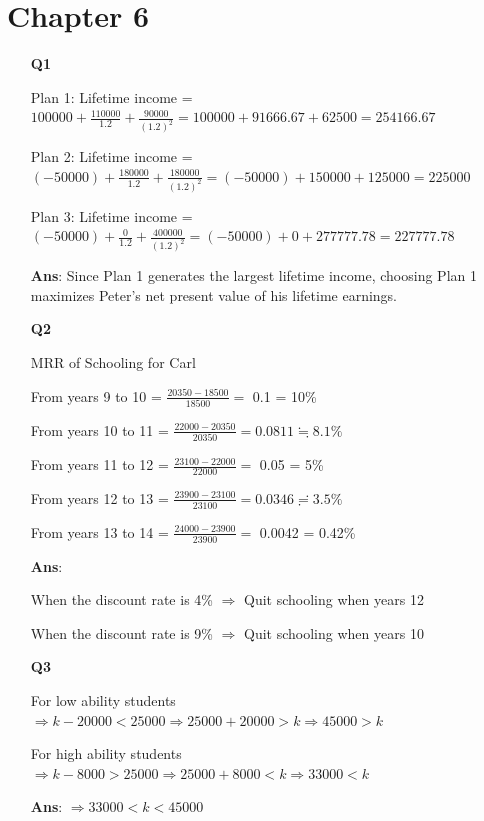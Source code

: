 \documentclass[12pt]{article}
\begin{document}
\section{Chapter 6}
\begin{enumerate}
    \item [\textbf{Q1}]

    Plan 1:
    Lifetime income = $100000 + \frac{110000}{1.2} + \frac{90000}{(1.2)^2} = 100000 + 91666.67 + 62500 = 254166.67$
    
    Plan 2:
    Lifetime income = $(-50000) + \frac{180000}{1.2} + \frac{180000}{(1.2)^2} = (-50000) + 150000 + 125000 = 225000$

    Plan 3:
    Lifetime income = $(-50000) + \frac{0}{1.2} + \frac{400000}{(1.2)^2} = (-50000) + 0 + 277777.78 = 227777.78$

    \textbf{Ans}:
    Since Plan 1 generates the largest lifetime income, choosing Plan 1 maximizes Peter’s net present value of his lifetime earnings.

    \newpage
    \item [\textbf{Q2}]

    MRR of Schooling for Carl

    From years 9 to 10 = $\frac{20350 - 18500}{18500} = $ 0.1 = 10\%
    
    From years 10 to 11 = $\frac{22000 - 20350}{20350} =  0.0811 \fallingdotseq 8.1\%$

    From years 11 to 12 = $\frac{23100 - 22000}{22000} = $ 0.05 = 5\%

    From years 12 to 13 = $\frac{23900 - 23100}{23100} =  0.0346 \risingdotseq 3.5\%$

    From years 13 to 14 = $\frac{24000 - 23900}{23900} = $ 0.0042 = 0.42\%

    \textbf{Ans}: 
    
    When the discount rate is 4\% $\Rightarrow$ Quit schooling when years 12

    When the discount rate is 9\% $\Rightarrow$ Quit schooling when years 10
    
    \item [\textbf{Q3}]

    For low ability students $\Rightarrow k - 20000 < 25000 \Rightarrow 25000 + 20000 > k \Rightarrow 45000 > k$

    For high ability students $\Rightarrow k - 8000 > 25000 \Rightarrow 25000 + 8000 < k \Rightarrow 33000 < k$

    \textbf{Ans}:
    $\Rightarrow 33000 < k < 45000$
\end{enumerate}
\end{document}
